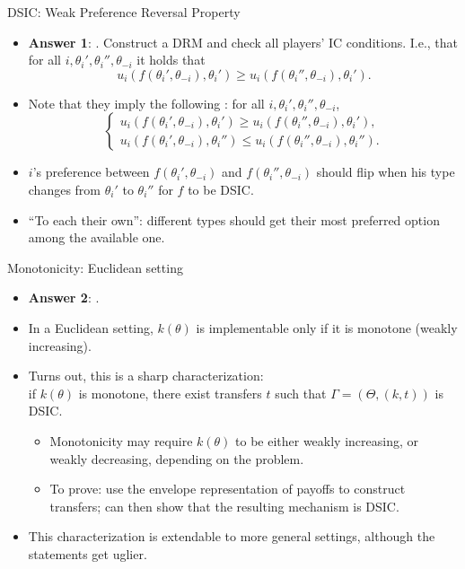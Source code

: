 \documentclass[english,10pt
,aspectratio=169
]{beamer}
\begin{document}
\begin{frame}{DSIC: Weak Preference Reversal Property}
	\begin{itemize}
		\item \textbf{Answer 1}: . Construct a DRM and check all players' \alert{IC conditions}. I.e., that for all $i,\theta_i',\theta_i'',\theta_{-i}$ it holds that
		$$ u_{i}(f(\theta_{i}', \theta_{-i}), \theta_{i}') \geq u_{i}(f(\theta_{i}'', \theta_{-i}), \theta_{i}').$$
		
		\item Note that they imply the following : for all $i,\theta_i',\theta_i'',\theta_{-i}$,
		\begin{equation*}
			\begin{cases}
				u_{i}(f(\theta_{i}', \theta_{-i}), \theta_{i}') \geq u_{i}(f(\theta_{i}'', \theta_{-i}), \theta_{i}'),
				\\
				u_{i}(f(\theta_{i}', \theta_{-i}), \theta_{i}'') \leq u_{i}(f(\theta_{i}'', \theta_{-i}), \theta_{i}'').
			\end{cases}
		\end{equation*}
		\item $i$'s preference between $f(\theta_{i}', \theta_{-i})$ and $f(\theta_{i}'', \theta_{-i})$ should flip when his type changes from $\theta_i'$ to $\theta_i''$ for $f$ to be DSIC. 
		\item ``To each their own'': different types should get their most preferred option among the available one.
	\end{itemize}
\end{frame}


\begin{frame}{Monotonicity: Euclidean setting}
	\begin{itemize}
		\item \textbf{Answer 2}: .
		\item In a Euclidean setting, $k(\theta)$ is implementable only if it is monotone (weakly increasing).
		\item Turns out, this is a sharp characterization: \\
		if $k(\theta)$ is monotone, there exist transfers $t$ such that $\Gamma = (\Theta, (k,t))$ is DSIC.
		\begin{itemize}
			\item Monotonicity may require $k(\theta)$ to be either weakly increasing, or weakly decreasing, depending on the problem.
			\item To prove: use the envelope representation of payoffs to construct transfers; can then show that the resulting mechanism is DSIC.
		\end{itemize}
		\item This characterization is extendable to more general settings, although the statements get uglier.
	\end{itemize}
\end{frame}
\end{document}
